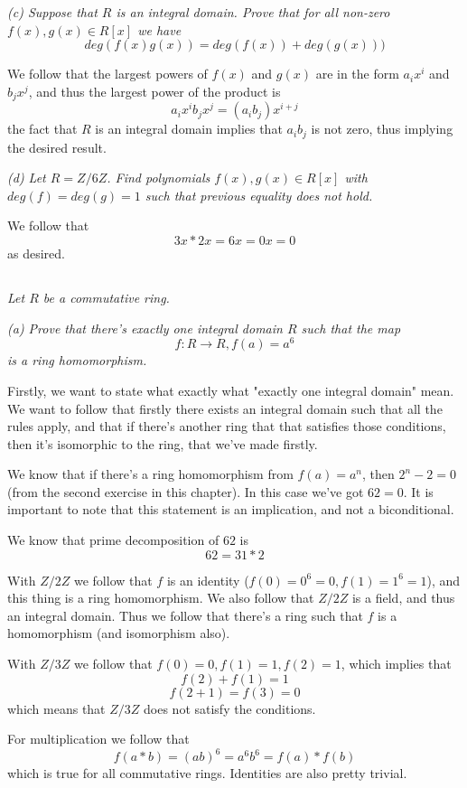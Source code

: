 \documentclass[11pt,oneside,titlepage]{book}
\begin{document}
\textit{(c) Suppose that $R$ is an integral domain. Prove that
  for all non-zero $f(x), g(x) \in R[x]$ we have
  $$deg(f(x) g(x)) = deg(f(x)) + deg(g(x)))$$}

We follow that the largest powers of $f(x)$ and $g(x)$ are
in the form $a_i x^i$ and $b_j x^j$, and thus the largest power of
the product is
$$a_i x^i b_j x^j = (a_i b_j)x^{i + j}$$
the fact that $R$ is an integral domain implies that $a_i b_j$ is
not zero, thus implying the desired result.

\textit{(d) Let $R = Z/6Z$. Find polynomials $f(x), g(x) \in R[x]$
  with $deg(f) = deg(g) = 1$ such that previous equality does not hold.}

We follow that
$$3x * 2x = 6x = 0x = 0$$
as desired.

\subsection{}

\textit{Let $R$ be a commutative ring.}

\textit{(a) Prove that there's exactly one integral domain $R$ such
that the map
$$f: R \to R, f(a) = a^6$$
is a ring homomorphism.}

Firstly, we want to state what exactly what "exactly one integral
domain" mean. We want to follow that firstly there exists an integral
domain such that all the rules apply, and that if there's another ring
that that satisfies those conditions, then it's isomorphic to the
ring, that we've made firstly.

We know that if there's a ring homomorphism from $f(a) = a^n$, then
$2^n - 2 = 0$ (from the second exercise in this chapter). In this case
we've got $62 = 0$. It is important to note that this statement is an
implication, and not a biconditional.

We know that prime decomposition of $62$ is
$$62 = 31 * 2$$

With $Z/2Z$ we follow that $f$ is an identity ($f(0) = 0^6 = 0, f(1) =
1^6 = 1$), and this thing is a ring homomorphism. We also follow that
$Z/2Z$ is a field, and thus an integral domain. Thus we follow that there's a
ring such that $f$ is a homomorphism (and isomorphism also).

With $Z/3Z$ we follow that $f(0) = 0, f(1) = 1, f(2) = 1$, which
implies that
$$f(2) + f(1) = 1$$
$$f(2 + 1) = f(3) = 0$$
which means that $Z/3Z$ does not satisfy the conditions.

For multiplication we follow that
$$f(a * b) = (ab)^6 = a^6 b^6 = f(a) * f(b)$$
which is true for all commutative rings. Identities are also pretty
trivial.
\end{document}
